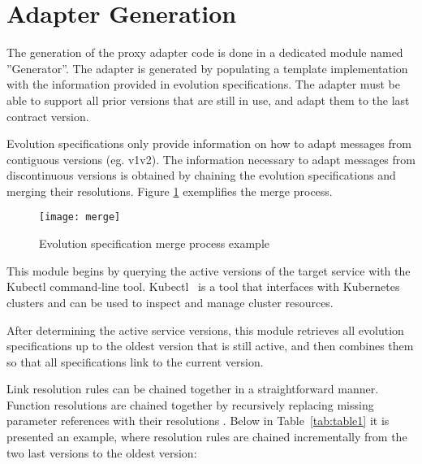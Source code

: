\section{Adapter Generation} %
\label{sec:adapter_generation}

The generation of the proxy adapter code is done in a dedicated module named ''Generator''.
The adapter is generated by populating a template implementation with the information provided in evolution specifications.
The adapter must be able to support all prior versions that are still in use, and adapt them to the last contract version.

Evolution specifications only provide information on how to adapt messages from contiguous versions (eg. v1\textrightarrow v2).
The information necessary to adapt messages from discontinuous versions is obtained by chaining the evolution specifications and
merging their resolutions. Figure \ref{fig:merge} exemplifies the merge process.

\begin{figure}[htbp]
    \centering
    \texttt{[image: merge]}
    \caption{Evolution specification merge process example}
    \label{fig:merge}
\end{figure}

This module begins by querying the active versions of the target service with the Kubectl command-line tool.
Kubectl~\cite{kubectl} is a tool that interfaces with Kubernetes clusters and can be used to inspect and manage cluster resources.

After determining the active service versions, this module retrieves all evolution specifications up to the oldest version that is still active,
and then combines them so that all specifications link to the current version.

Link resolution rules can be chained together in a straightforward manner.
Function resolutions are chained together by recursively replacing missing parameter references with their resolutions .
Below in Table~\ref{tab:table1} it is presented an example, where resolution rules are chained incrementally from the two last versions to the oldest version:

